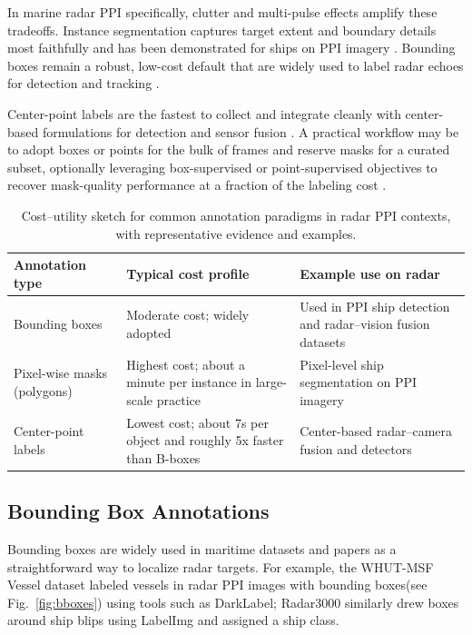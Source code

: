 \documentclass[twocolumn, 10pt]{article}
\begin{document}
In marine radar PPI specifically, clutter and multi-pulse effects amplify these tradeoffs. Instance segmentation captures target extent and boundary details most faithfully and has been demonstrated for ships on PPI imagery \cite{ref10}. Bounding boxes remain a robust, low-cost default that are widely used to label radar echoes for detection and tracking \cite{ref4,ref2,ref1}. 

Center-point labels are the fastest to collect and integrate cleanly with center-based formulations for detection and sensor fusion \cite{ref13}. A practical workflow may be to adopt boxes or points for the bulk of frames and reserve masks for a curated subset, optionally leveraging box-supervised or point-supervised objectives to recover mask-quality performance at a fraction of the labeling cost \cite{boxinst_cvpr2021,pointly_supervised_cvpr2022}.

\begin{table}[htbp]
\centering
\begin{tabular}{p{3.2cm} p{4.6cm} p{6.2cm}}
\hline
Annotation type & Typical cost profile & Example use on radar \\
\hline
Bounding boxes & Moderate cost; widely adopted & Used in PPI ship detection and radar–vision fusion datasets \cite{ref4,ref2,ref1} \\
Pixel-wise masks (polygons) & Highest cost; about a minute per instance in large-scale practice \cite{coco_time_2024} & Pixel-level ship segmentation on PPI imagery \cite{ref10} \\
Center-point labels & Lowest cost; about 7s per object and roughly 5x faster than B-boxes \cite{extreme_clicking_iccv2017} & Center-based radar–camera fusion and detectors \cite{ref13} \\
\hline
\end{tabular}
\caption{Cost–utility sketch for common annotation paradigms in radar PPI contexts, with representative evidence and examples.}
\label{tab:ann_summary}
\end{table}



\subsection{Bounding Box Annotations}

Bounding boxes are widely used in maritime datasets and papers as a straightforward way to localize radar targets. For example, the WHUT-MSF Vessel dataset labeled vessels in radar PPI images with bounding boxes(see Fig.~\ref{fig:bboxes}) using tools such as DarkLabel\cite{ref2}; Radar3000 similarly drew boxes around ship blips using LabelImg and assigned a ship class\cite{ref1}.
\end{document}

